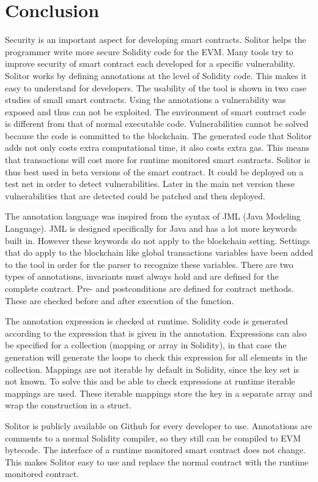 \documentclass[a4paper]{article}
\begin{document}
\newpage
\section{Conclusion}
\label{sec:conclusion}
Security is an important aspect for developing smart contracts. Solitor helps the programmer write more secure Solidity code for the EVM. Many tools try to improve security of smart contract each developed for a specific vulnerability. Solitor works by defining annotations at the level of Solidity code. This makes it easy to understand for developers. The usability of the tool is shown in two case studies of small smart contracts. Using the annotations a vulnerability was exposed and thus can not be exploited. The environment of smart contract code is different from that of normal executable code. Vulnerabilities cannot be solved because the code is committed to the blockchain. The generated code that Solitor adds not only costs extra computational time, it also costs extra gas. This means that transactions will cost more for runtime monitored smart contracts. Solitor is thus best used in beta versions of the smart contract. It could be deployed on a test net in order to detect vulnerabilities. Later in the main net version these vulnerabilities that are detected could be patched and then deployed. \par
The annotation language was inspired from the syntax of JML (Java Modeling Language). JML is designed specifically for Java and has a lot more keywords built in. However these keywords do not apply to the blockchain setting. Settings that do apply to the blockchain like global transactions variables have been added to the tool in order for the parser to recognize these variables. There are two types of annotations, invariants must always hold and are defined for the complete contract. Pre- and postconditions are defined for contract methods. These are checked before and after execution of the function. \par
The annotation expression is checked at runtime. Solidity code is generated according to the expression that is given in the annotation. Expressions can also be specified for a collection (mapping or array in Solidity), in that case the generation will generate the loops to check this expression for all elements in the collection. Mappings are not iterable by default in Solidity, since the key set is not known. To solve this and be able to check expressions at runtime iterable mappings are used. These iterable mappings store the key in a separate array and wrap the construction in a struct. \par
Solitor is publicly available on Github for every developer to use. Annotations are comments to a normal Solidity compiler, so they still can be compiled to EVM bytecode. The interface of a runtime monitored smart contract does not change. This makes Solitor easy to use and replace the normal contract with the runtime monitored contract. 
\end{document}
